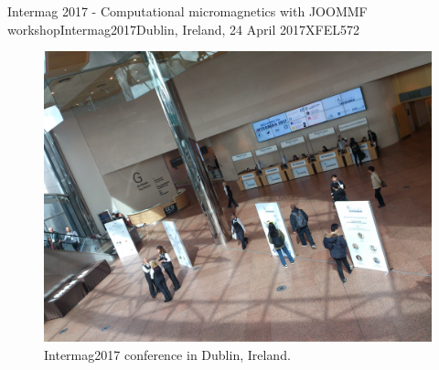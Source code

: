 \begin{event}{Intermag 2017 - Computational micromagnetics with JOOMMF workshop}{Intermag2017}{Dublin, Ireland, 24 April 2017}{XFEL}{57}{2}{}
\begin{figure}[ht]
\includegraphics[scale=.1]{IntermagPhoto2.jpg}
\caption*{Intermag2017 conference in Dublin, Ireland.}
\end{figure}

\end{event}

